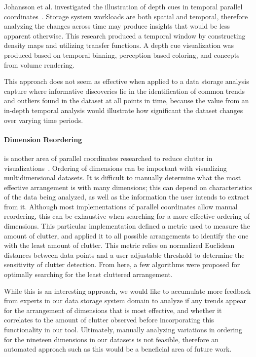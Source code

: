 \documentclass[journal]{vgtc}                %
\begin{document}
Johansson et al. investigated the illustration of depth cues in temporal parallel coordinates~\cite{johansson:2007:DCDTPC}. Storage system workloads are both spatial and temporal, therefore analyzing the changes across time may produce insights that would be less apparent otherwise. This research produced a temporal window by constructing density maps and utilizing transfer functions. A depth cue visualization was produced based on temporal binning, perception based coloring, and concepts from volume rendering.

This approach does not seem as effective when applied to a data storage analysis capture where informative discoveries lie in the identification of common trends and outliers found in the dataset at all points in time, because the value from an in-depth temporal analysis would illustrate how significant the dataset changes over varying time periods.

\paragraph{Dimension Reordering}
\label{dimensional_reordering}
is another area of parallel coordinates researched to reduce clutter in visualizations~\cite{peng:2005:CRMD}. Ordering of dimensions can be important with visualizing multidimensional datasets. It is difficult to manually determine what the most effective arrangement is with many dimensions; this can depend on characteristics of the data being analyzed, as well as the information the user intends to extract from it. Although most implementations of parallel coordinates allow manual reordering, this can be exhaustive when searching for a more effective ordering of dimensions. This particular implementation defined a metric used to measure the amount of clutter, and applied it to all possible arrangements to identify the one with the least amount of clutter. This metric relies on normalized Euclidean distances between data points and a user adjustable threshold to determine the sensitivity of clutter detection. From here, a few algorithms were proposed for optimally searching for the least cluttered arrangement. 

While this is an interesting approach, we would like to accumulate more feedback from experts in our data storage system domain to analyze if any trends appear for the arrangement of dimensions that is most effective, and whether it correlates to the amount of clutter observed before incorporating this functionality in our tool. Ultimately, manually analyzing variations in ordering for the nineteen dimensions in our datasets is not feasible, therefore an automated approach such as this would be a beneficial area of future work.
\end{document}
